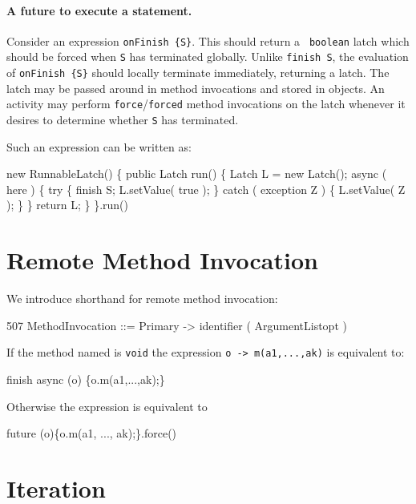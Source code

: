 
\paragraph{A future to execute a statement.}
Consider an expression {\tt onFinish \{S\}}. This should return a {\tt
boolean} latch which should be forced when {\tt S} has terminated
globally. Unlike {\tt finish S}, the evaluation of {\tt onFinish
\{S\}} should locally terminate immediately, returning a latch. The
latch may be passed around in method invocations and stored in
objects. An activity may perform {\tt force}/{\tt forced} method
invocations on the latch whenever it desires to determine whether {\tt S}
has terminated.

Such an expression can be written as:
\begin{x10}
  new RunnableLatch() \{
      public Latch run() \{
         Latch L = new Latch();
         async ( here ) \{
            try \{
                finish S;
                L.setValue( true );
            \} catch ( exception Z ) \{
                 L.setValue( Z );
            \}
         \}
         return L;
      \}
    \}.run()
\end{x10}

\section{Remote Method Invocation}
We introduce shorthand for remote method invocation:

\begin{x10}
507   MethodInvocation ::= 
        Primary -> identifier ( ArgumentListopt )
\end{x10}

If the method named is {\tt void} the expression {\tt o -> m(a1,...,ak)}
is equivalent to:
\begin{x10}
 finish async (o) \{o.m(a1,...,ak);\}
\end{x10}

Otherwise the expression is equivalent to
\begin{x10}
 future (o)\{o.m(a1, ..., ak);\}.force()
\end{x10}

\section{Iteration}\label{ForLoop}
\label{ForAllLoop}

